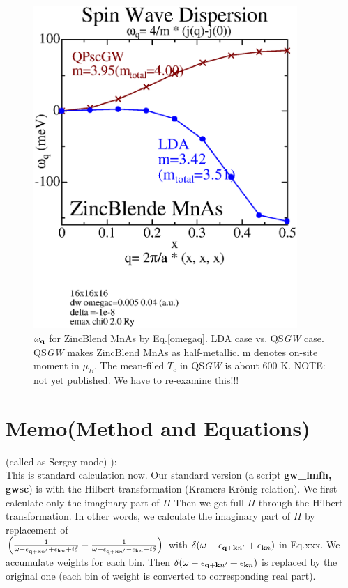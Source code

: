\documentclass[a4paper,10pt,epsf,fleqn]{article}
\newcommand{\bfq}{{\bf q}}
\newcommand{\scgw}{QS{\it GW} }
\begin{document}
\begin{figure}[hbpt]
\begin{center}
\includegraphics[width=10cm]{ZBmnasw1.eps}
\end{center}
\caption[]{
$\omega_\bfq$ for ZincBlend MnAs by Eq.\ref{omegaq}. 
LDA case vs. \scgw case. 
\scgw makes ZincBlend MnAs as half-metallic. 
m denotes on-site moment in $\mu_B$. 
The mean-filed $T_c$ in \scgw is about 600 K.
{\large NOTE: not yet published. We have to re-examine this!!!}}
\label{zbmnas}
\end{figure}


\newpage
\section{Memo({Method and Equations})}

\vspace{1cm}
(called as Sergey mode) ):\\
This is standard calculation now.
Our standard version (a script {\bf gw\_lmfh, gwsc}) is with
the Hilbert transformation (Kramers-Kr\"onig relation).
We first calculate only the imaginary part of $\Pi$
Then we get full $\Pi$ through the Hilbert transformation.
In other words, we calculate the imaginary part of $\Pi$ by replacement of\\
$\left(\frac{1}{\omega-\epsilon_{{\bf q+k}n'}+\epsilon_{{\bf k}n}+i \delta}
-\frac{1}{\omega+\epsilon_{{\bf q+k}n'}-\epsilon_{{\bf k}n}-i \delta}\right)$
with $\delta(\omega-\epsilon_{{\bf q+k}n'}+\epsilon_{{\bf k}n})$
in Eq.xxx. We accumulate weights for each bin.
Then $\delta(\omega-\epsilon_{{\bf q+k}n'}+\epsilon_{{\bf k}n})$
is replaced by the original one (each bin of weight is converted to 
corresponding real part). \\
\end{document}

